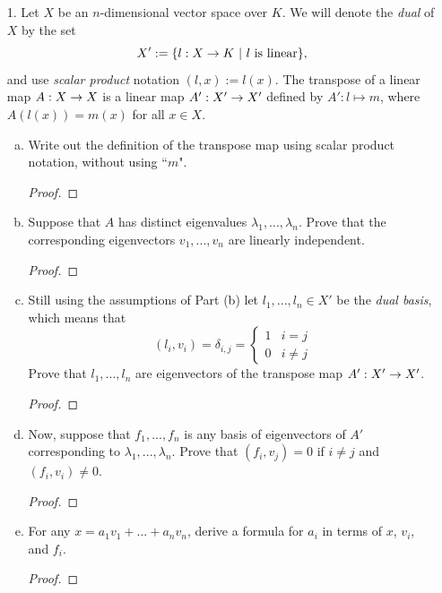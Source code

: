 
\begin{itemize}

\item[1.] Let $X$ be an $n$-dimensional vector space over $K$. We will denote the \textit{dual} of $X$ by
the set 
$$X' := \{l:X \rightarrow K \ | \ l \text{ is linear}\},$$
and use \textit{scalar product} notation $(l, x) := l(x)$. The transpose of a linear map
$A: X \rightarrow X$ is a linear map $A': X' \rightarrow X'$ defined by $A':l \mapsto m$, where $A(l(x)) = m(x)$ for all $x \in X$.
\begin{enumerate}[(a)]
\item Write out the definition of the transpose map using scalar product
notation, without using ``$m$".
\begin{proof}

\end{proof}

\item Suppose that $A$ has distinct eigenvalues $\lambda_1, . . . , \lambda_n$. Prove that the
corresponding eigenvectors $v_1, . . . , v_n$ are linearly independent.
\begin{proof}

\end{proof}

\item Still using the assumptions of Part (b) let $l_1, . . . , l_n \in X'$ be the \textit{dual basis}, which means that
\begin{equation*}
(l_i, v_i) = \delta_{i,j} =  \left\{
        \begin{array}{ll}
            1 & i=j \\
            0 & i \neq j 
        \end{array}
    \right.
\end{equation*}
Prove that $l_1, . . . , l_n$ are eigenvectors of the transpose map $A': X' \rightarrow X'$.
\begin{proof}

\end{proof}

\item Now, suppose that $f_1, . . . , f_n$ is any basis of eigenvectors of $A'$ corresponding to $\lambda_1, . . . , \lambda_n$. Prove that $(f_i, v_j ) = 0$ if $i \neq j$ and $(f_i, v_i) \neq 0$.
\begin{proof}

\end{proof}

\item For any $x = a_1v_1 + ... + a_nv_n$, derive a formula for $a_i$ in terms of $x$, $v_i$, and $f_i$.
\begin{proof}


\end{proof}
\end{enumerate}
\end{itemize}
